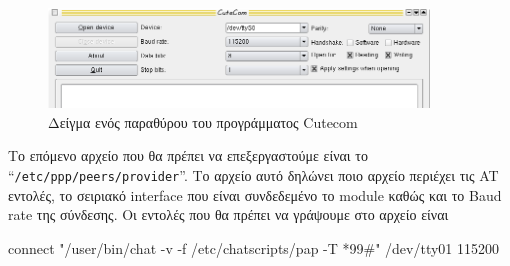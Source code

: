 \documentclass[12pt, a4paper, oneside]{report}
\begin{document}
\begin{figure}[!h]
\centering
\includegraphics[width=0.9\textwidth]{eikona_29}
\caption{Δείγμα ενός παραθύρου του προγράμματος Cutecom}\label{eik29}
\end{figure}


Το επόμενο αρχείο που θα πρέπει να επεξεργαστούμε είναι \phantom{a}το \mbox{``\texttt{\slash etc\slash ppp\slash peers\slash provider}''}. Το αρχείο αυτό δηλώνει ποιο αρχείο περιέχει τις AT εντολές, το σειριακό interface που είναι συνδεδεμένο το module καθώς και το Baud rate της σύνδεσης. Οι εντολές που θα πρέπει να γράψουμε στο αρχείο είναι
\begin{code}
connect "/user/bin/chat -v -f /etc/chatscripts/pap -T *99#"
/dev/tty01
115200
\end{code}
\end{document}
